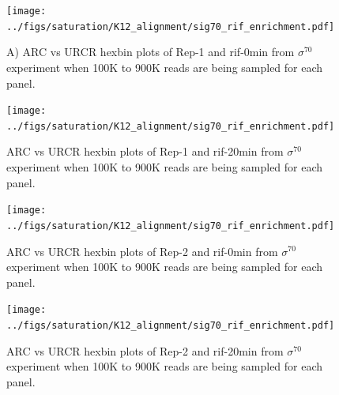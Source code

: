 \documentclass{bmcart}\usepackage[]{graphicx}\usepackage[]{color}
\newcommand{\sig}{\sigma^{70}}
\begin{document}

\newpage

\begin{figure}[h!]
  \centering
  \texttt{[image: ../figs/saturation/K12\_alignment/sig70\_rif\_enrichment.pdf]}
  \caption{A) ARC vs URCR hexbin plots of Rep-1 and rif-0min from $\sig$ experiment when 100K to 900K reads are being
    sampled for each panel. }
  \label{fig:exoQC_sat1}
\end{figure}

\newpage

\begin{figure}[h!]
  \centering
  \texttt{[image: ../figs/saturation/K12\_alignment/sig70\_rif\_enrichment.pdf]}

  \caption{ARC vs URCR hexbin plots of Rep-1 and rif-20min from $\sig$ experiment when 100K to 900K reads are being
    sampled for each panel.}
  \label{fig:exoQC_sat2}
\end{figure}

\newpage

\begin{figure}[h!]
  \centering
  \texttt{[image: ../figs/saturation/K12\_alignment/sig70\_rif\_enrichment.pdf]}
  \caption{ARC vs URCR hexbin plots of Rep-2 and rif-0min from $\sig$
    experiment when 100K to 900K reads are being sampled for each
    panel.}
  \label{fig:exoQC_sat3}
\end{figure}

\newpage

\begin{figure}[h!]
  \centering
  \texttt{[image: ../figs/saturation/K12\_alignment/sig70\_rif\_enrichment.pdf]}
  \caption{ARC vs URCR hexbin plots of Rep-2 and rif-20min from $\sig$ experiment when 100K to 900K reads are being
    sampled for each panel.}
  \label{fig:exoQC_sat4}
\end{figure}
\end{document}
